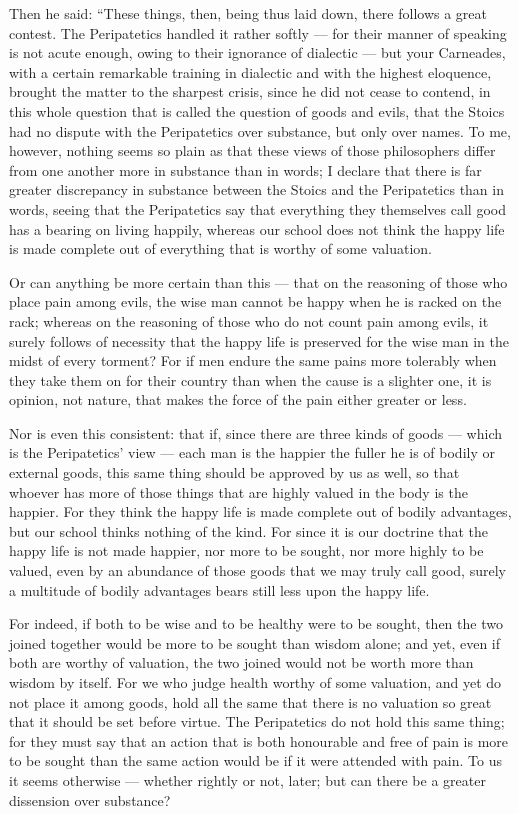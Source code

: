  Then he said: ``These things, then, being thus laid down, there follows a great contest. The Peripatetics handled it rather softly — for their manner of speaking is not acute enough, owing to their ignorance of dialectic — but your Carneades, with a certain remarkable training in dialectic and with the highest eloquence, brought the matter to the sharpest crisis, since he did not cease to contend, in this whole question that is called the question of goods and evils, that the Stoics had no dispute with the Peripatetics over substance, but only over names. To me, however, nothing seems so plain as that these views of those philosophers differ from one another more in substance than in words; I declare that there is far greater discrepancy in substance between the Stoics and the Peripatetics than in words, seeing that the Peripatetics say that everything they themselves call good has a bearing on living happily, whereas our school does not think the happy life is made complete out of everything that is worthy of some valuation.

 Or can anything be more certain than this — that on the reasoning of those who place pain among evils, the wise man cannot be happy when he is racked on the rack; whereas on the reasoning of those who do not count pain among evils, it surely follows of necessity that the happy life is preserved for the wise man in the midst of every torment? For if men endure the same pains more tolerably when they take them on for their country than when the cause is a slighter one, it is opinion, not nature, that makes the force of the pain either greater or less.

 Nor is even this consistent: that if, since there are three kinds of goods — which is the Peripatetics' view — each man is the happier the fuller he is of bodily or external goods, this same thing should be approved by us as well, so that whoever has more of those things that are highly valued in the body is the happier. For they think the happy life is made complete out of bodily advantages, but our school thinks nothing of the kind. For since it is our doctrine that the happy life is not made happier, nor more to be sought, nor more highly to be valued, even by an abundance of those goods that we may truly call good, surely a multitude of bodily advantages bears still less upon the happy life.

 For indeed, if both to be wise and to be healthy were to be sought, then the two joined together would be more to be sought than wisdom alone; and yet, even if both are worthy of valuation, the two joined would not be worth more than wisdom by itself. For we who judge health worthy of some valuation, and yet do not place it among goods, hold all the same that there is no valuation so great that it should be set before virtue. The Peripatetics do not hold this same thing; for they must say that an action that is both honourable and free of pain is more to be sought than the same action would be if it were attended with pain. To us it seems otherwise — whether rightly or not, later; but can there be a greater dissension over substance?

